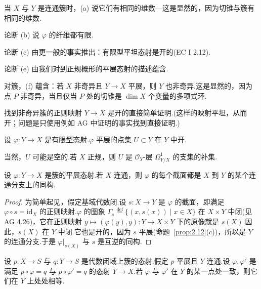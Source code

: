 当 $X$ 与 $Y$ 是连通簇时，(a) 说它们有相同的维数---这是显然的，因为切锥与簇有相同的维数.

论断 (b) 说 $\varphi$ 的纤维都有限.

论断 (c) 由更一般的事实推出：有限型平坦态射是开的(EC I 2.12).

论断 (e) 由我们对到正规概形的平展态射的描述蕴含.

对簇，(f) 蕴含：若 $X$ 非奇异且 $Y \to X$ 平展，则 $Y$ 也非奇异.这是显然的，因为点 $P$ 非奇异，当且仅当 $P$ 处的切锥是 $\dim X$ 个变量的多项式环.

\begin{exercise}\label{exc:2.13}
找到非奇异簇的正则映射 $Y \to X$ 是开的直接简单证明.(这样的映射平坦，从而开；问题是只使用例如 AG 中证明的事实找到直接证明.)
\end{exercise}

\begin{proposition}\label{prop:2.14}
设 $\varphi \colon Y \to X$ 是有限型态射.$\varphi$ 平展的点集 $U \subset Y$ 在 $Y$ 中开.
\end{proposition}

当然，$U$ 可能是空的.若 $X$ 正规，则 $U$ 是 $\mathcal{O}_Y$-层 $\Omega^{1}_{Y/X}$ 的支集的补集.

\begin{proposition}\label{prop:2.15}
设 $\varphi \colon Y \to X$ 是簇的平展态射.若 $X$ 连通，则 $\varphi$ 的每个截面都是 $X$ 到 $Y$ 的某个连通分支上的同构.
\end{proposition}

\begin{proof}
为简单起见，假定基域代数闭.设 $s \colon X \to Y$ 是 $\varphi$ 的截面，即满足 $\varphi \circ s = \mathrm{id}_{X}$ 的正则映射.$\varphi$ 的图象 $\Gamma_{s} \overset{\mathrm{def}}{=} \{(x, s(x)) \mid x \in X\}$ 在 $X \times Y$ 中闭(见 AG 4.26)，它在正则映射 $y \mapsto (\varphi(y), y) \colon Y \to X \times Y$ 下的原像就是 $s(X)$.因此，$s(X)$ 在 $Y$ 中闭.它也是开的，因为 $s$ 平展(命题~\ref{prop:2.12}(c))，所以是 $Y$ 的连通分支.于是 $\varphi|_{s(X)}$ 与 $s$ 是互逆的同构.
\end{proof}

\begin{corollary}\label{cor:2.16}
设 $p \colon X \to S$ 与 $q \colon Y \to S$ 是代数闭域上簇的态射.假定 $p$ 平展且 $Y$ 连通.设 $\varphi, \varphi'$ 是满足 $p \circ \varphi = q$ 与 $p \circ \varphi' = q$ 的态射 $Y \to X$.若 $\varphi$ 与 $\varphi'$ 在 $Y$ 的某一点处一致，则它们在 $Y$ 上处处相等.
\end{corollary}

